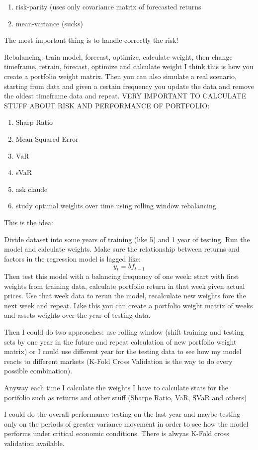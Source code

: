 \begin{enumerate}
    \item risk-parity (uses only covariance matrix of forecasted returns
    \item mean-variance (sucks)
\end{enumerate}
The most important thing is to handle correctly the risk!

Rebalancing: train model, forecast, optimize, calculate weight, then change timeframe, retrain, forecast, optimize and calculate weight
I think this is how you create a portfolio weight matrix.
Then you can also simulate a real scenario, starting from data and given a certain frequency you update the data and remove the oldest timeframe data and repeat.
VERY IMPORTANT TO CALCULATE STUFF ABOUT RISK AND PERFORMANCE OF PORTFOLIO:
\begin{enumerate}
    \item Sharp Ratio
    \item Mean Squared Error
    \item VaR
    \item sVaR
    \item ask claude
    \item study optimal weights over time using rolling window rebalancing
\end{enumerate}

This is the idea:

Divide dataset into some years of training (like 5) and 1 year of testing. Run the model and calculate weights. Make sure the relationship between returns and factors in the regression model is lagged like:
\begin{equation}
    y_t = bf_{t-1}
\end{equation}
Then test this model with a balancing frequency of one week: start with first weights from training data, calculate portfolio return in that week given actual prices. Use that week data to rerun the model, recalculate new weights fore the next week and repeat. Like this you can create a portfolio weight matrix of weeks and assets weights over the year of testing data. 

Then I could do two approaches: use rolling window (shift training and testing sets by one year in the future and repeat calculation of new portfolio weight matrix) or I could use different year for the testing data to see how my model reacts to different markets (K-Fold Cross Validation is the way to do every possible combination).

Anyway each time I calculate the weights I have to calculate stats for the portfolio such as returns and other stuff (Sharpe Ratio, VaR, SVaR and others)

I could do the overall performance testing on the last year and maybe testing only on the periods of greater variance movement in order to see how the model performs under critical economic conditions. 
There is alwyas K-Fold cross validation available.

